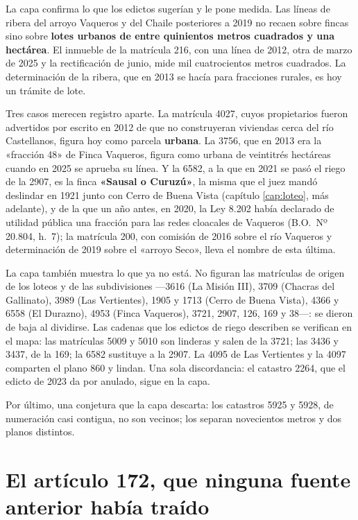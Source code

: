 \begin{cautela}
La capa confirma lo que los edictos sugerían y le pone medida. Las líneas de ribera del arroyo Vaqueros y del Chaile posteriores a 2019 no recaen sobre fincas sino sobre \textbf{lotes urbanos de entre quinientos metros cuadrados y una hectárea}. El inmueble de la matrícula 216, con una línea de 2012, otra de marzo de 2025 y la rectificación de junio, mide mil cuatrocientos metros cuadrados. La determinación de la ribera, que en 2013 se hacía para fracciones rurales, es hoy un trámite de lote.

Tres casos merecen registro aparte. La matrícula 4027, cuyos propietarios fueron advertidos por escrito en 2012 de que no construyeran viviendas cerca del río Castellanos, figura hoy como parcela \textbf{urbana}. La 3756, que en 2013 era la «fracción 48» de Finca Vaqueros, figura como urbana de veintitrés hectáreas cuando en 2025 se aprueba su línea. Y la 6582, a la que en 2021 se pasó el riego de la 2907, es la finca \textbf{«Sausal o Curuzú»}, la misma que el juez mandó deslindar en 1921 junto con Cerro de Buena Vista (capítulo \ref{cap:loteo}, más adelante), y de la que un año antes, en 2020, la Ley 8.202 había declarado de utilidad pública una fracción para las redes cloacales de Vaqueros (B.O.\ Nº 20.804, h.\ 7); la matrícula 200, con comisión de 2016 sobre el río Vaqueros y determinación de 2019 sobre el «arroyo Seco», lleva el nombre de esta última.

La capa también muestra lo que ya no está. No figuran las matrículas de origen de los loteos y de las subdivisiones ---3616 (La Misión III), 3709 (Chacras del Gallinato), 3989 (Las Vertientes), 1905 y 1713 (Cerro de Buena Vista), 4366 y 6558 (El Durazno), 4953 (Finca Vaqueros), 3721, 2907, 126, 169 y 38---: se dieron de baja al dividirse. Las cadenas que los edictos de riego describen se verifican en el mapa: las matrículas 5009 y 5010 son linderas y salen de la 3721; las 3436 y 3437, de la 169; la 6582 sustituye a la 2907. La 4095 de Las Vertientes y la 4097 comparten el plano 860 y lindan. Una sola discordancia: el catastro 2264, que el edicto de 2023 da por anulado, sigue en la capa.

Por último, una conjetura que la capa descarta: los catastros 5925 y 5928, de numeración casi contigua, no son vecinos; los separan novecientos metros y dos planos distintos.
\end{cautela}

\section{El artículo 172, que ninguna fuente anterior había traído}

